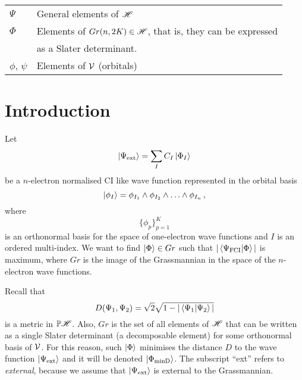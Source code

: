 \begin{center}
\begin{tabular}{ll}
    $\Psi$              & General elements of $\mathscr{H}$                                            \\
    $\Phi$              & Elements of $Gr(n, 2K) \in \mathscr{H}$, that is, they can be expressed      \\
                        & as a Slater determinant.                                                 \\
    $\phi$, $\psi$      & Elements of $\mathcal{V}{}$ (orbitals)                                        \\
    \hline
  \end{tabular}
\end{center}

\newpage
\section{Introduction}

Let
\begin{equation}\label{eq:ext_wf}
  \ket{\Psi_\text{ext}} = \sum_I C_I \ket{\Phi_I}
\end{equation}
be a $n$-electron normalised CI like wave function represented in the orbital basis
\begin{equation}
  \ket{\phi_I} = \phi_{I_1} \w \phi_{I_2} \w \dots \w \phi_{I_n}\,,
\end{equation}
where
\begin{equation}
  \{\phi_p\}_{p=1}^K
\end{equation}
is an orthonormal basis for the space of one-electron wave functions and $I$ is an ordered multi-index.
We want to find $\ket{\Phi} \in Gr$ such that $|\innerproduct{\Psi_\text{FCI}}{\Phi}|$ is maximum, where $Gr$ is the image of the Grassmannian in the space of the $n$-electron wave functions.

Recall that
\begin{equation}
  D(\Psi_1, \Psi_2) = \sqrt{2}\sqrt{1 - |\innerproduct{\Psi_1}{\Psi_2}|}
\end{equation}
is a metric in $\mathbb{P} \mathscr{H}$.\cite{}
Also, $Gr$ is the set of all elements of $\mathscr{H}$ that can be written as a single Slater determinant (a decomposable element) for some orthonormal basis of $\mathcal{V}{}$.
For this reason, such $\ket{\Phi}$ minimises the distance $D$ to the wave function $\ket{\Psi_\text{ext}}$ and it will be denoted $\ket{\Phi_\text{minD}}$.
The subscript ``ext'' refers to \emph{external}, because we assume that $\ket{\Psi_\text{ext}}$ is external to the Grassmannian.


